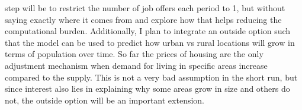 step will be to restrict the number of job offers each period to 1, but without saying exactly where it comes from and explore how that helps reducing the computational burden. Additionally, I plan to integrate an outside option such that the model can be used to predict how urban vs rural locations will grow in terms of population over time. So far the prices of housing are the only adjustment mechanism when demand for living in specific areas increase compared to the supply. This is not a very bad assumption in the short run, but since interest also lies in explaining why some areas grow in size and others do not, the outside option will be an important extension. 
